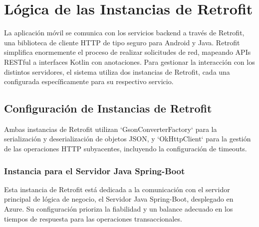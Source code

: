 \section{Lógica de las Instancias de Retrofit}

La aplicación móvil se comunica con los servicios backend a través de Retrofit, una biblioteca de cliente HTTP de tipo seguro para Android y Java. Retrofit simplifica enormemente el proceso de realizar solicitudes de red, mapeando APIs RESTful a interfaces Kotlin con anotaciones. Para gestionar la interacción con los distintos servidores, el sistema utiliza dos instancias de Retrofit, cada una configurada específicamente para su respectivo servicio.

\subsection{Configuración de Instancias de Retrofit}

Ambas instancias de Retrofit utilizan `GsonConverterFactory` para la serialización y deserialización de objetos JSON, y `OkHttpClient` para la gestión de las operaciones HTTP subyacentes, incluyendo la configuración de timeouts.

\subsubsection{Instancia para el Servidor Java Spring-Boot}

Esta instancia de Retrofit está dedicada a la comunicación con el servidor principal de lógica de negocio, el Servidor Java Spring-Boot, desplegado en Azure. Su configuración prioriza la fiabilidad y un balance adecuado en los tiempos de respuesta para las operaciones transaccionales.


